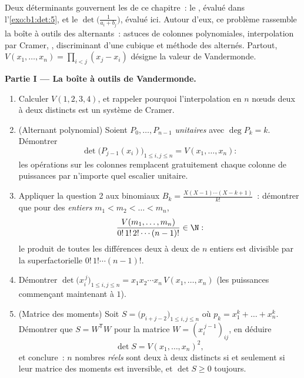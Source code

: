 \begin{problem}\label{pb:b1:det:1}
Deux déterminants gouvernent les  de ce chapitre~: le
, évalué dans l'\cref{exo:b1:det:5}, et le
\emph{} $\det\bigl(\frac{1}{a_i +
b_j}\bigr)$, évalué ici. Autour d'eux, ce problème rassemble la
boîte à outils des alternants~: astuces de colonnes polynomiales,
interpolation par Cramer, , discriminant d'une
cubique et méthode des  alternés. Partout, $V(x_1,
\dots, x_n) = \prod_{i < j}(x_j - x_i)$ désigne la valeur de
Vandermonde.

\medskip
\noindent\textbf{Partie I --- La boîte à outils de Vandermonde.}
\begin{enumerate}
  \item Calculer $V(1, 2, 3, 4)$, et rappeler pourquoi l'interpolation
        en $n$ nœuds deux à deux distincts est un système de Cramer.
  \item (Alternant polynomial) Soient $P_0, \dots, P_{n-1}$
        \emph{unitaires} avec $\deg P_k = k$. Démontrer
        \[
        \det\bigl(P_{j-1}(x_i)\bigr)_{1 \leq i, j \leq n}
        = V(x_1, \dots, x_n) :
        \]
        les opérations sur les colonnes remplacent gratuitement chaque
        colonne de puissances par n'importe quel escalier unitaire.
  \item Appliquer la question 2 aux  binomiaux $B_k =
        \frac{X(X-1)\cdots(X-k+1)}{k!}$~: démontrer que pour des
        \emph{entiers} $m_1 < m_2 < \dots < m_n$,
        \[
        \frac{V(m_1, \dots, m_n)}{0!\,1!\,2!\cdots(n-1)!}
        \in \N :
        \]
        le produit de toutes les différences deux à deux de $n$
        entiers est divisible par la superfactorielle
        $0!\,1!\cdots(n-1)!$.
  \item Démontrer $\det\bigl(x_i^{\,j}\bigr)_{1 \leq i, j \leq n} =
        x_1 x_2 \cdots x_n\, V(x_1, \dots, x_n)$ (les puissances
        commençant maintenant à $1$).
  \item (Matrice des moments) Soit $S = \bigl(p_{i+j-2}\bigr)_{1 \leq
        i, j \leq n}$ où $p_k = x_1^k + \dots + x_n^k$. Démontrer
        que $S = W^{\mathsf T} W$ pour la matrice $W =
        (x_i^{\,j-1})_{ij}$, en déduire
        \[
        \det S = V(x_1, \dots, x_n)^2 ,
        \]
        et conclure~: $n$ nombres \emph{réels} sont deux à deux
        distincts si et seulement si leur matrice des moments est
        inversible, et $\det S \geq 0$ toujours.
\end{enumerate}


\end{problem}
